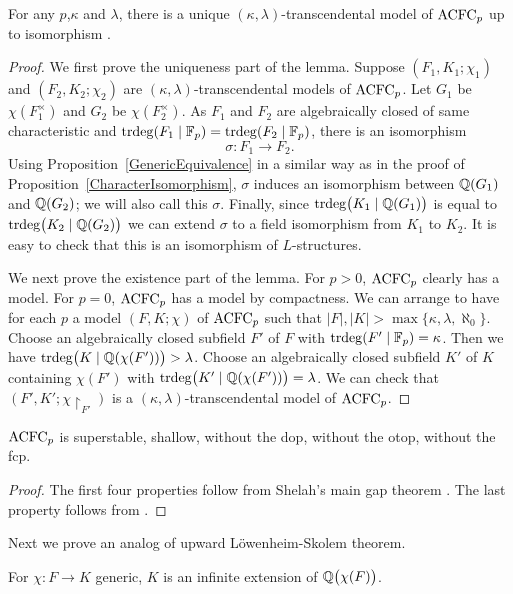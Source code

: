 \begin{thm}\label{ThmIso}

For any $p$,$\kappa$ and $\lambda$, there is a unique $(\kappa,\lambda)$-transcendental model of $\mathrm{ACFC}_p$ up to isomorphism .
\end{thm}


\begin{proof}

We first prove the uniqueness part of the lemma. Suppose $(F_1,K_1;\chi_1)$ and $(F_2,K_2;\chi_2)$ are $(\kappa,\lambda)$-transcendental models of $\mathrm{ACFC}_p$. Let $G_1$ be $\chi (F_1^\times)$ and $G_2$ be $\chi (F_2^\times)$. As $F_1$ and $F_2$ are algebraically closed of same characteristic and  $\mathrm{trdeg}(F_1 \mid\mathbb{F}_p) = \mathrm{trdeg}(F_2 \mid \mathbb{F}_p) $, there is an isomorphism $$\sigma: F_1 \to F_2.$$ Using Proposition~\ref{GenericEquivalence} in a similar way as in the proof of Proposition~\ref{CharacterIsomorphism}, $\sigma$ induces an isomorphism between $ \mathbb{Q}(G_1)$ and $\mathbb{Q}(G_2)$; we will also call this $\sigma$. Finally, since $\mathrm{trdeg}\big(K_1\mid\mathbb{Q}(G_1)\big)$ is equal to $\mathrm{trdeg}\big(K_2\mid \mathbb{Q}(G_2)\big)$ we can extend $\sigma$ to a field isomorphism from $K_1$ to $K_2$. It is easy to check that this is an isomorphism of $L$-structures.

We next prove the existence part of the lemma. For $p>0$, $\mathrm{ACFC}_p$ clearly has a model. For $p=0$, $\mathrm{ACFC}_p$ has a model by compactness. We can arrange to have for each $p$ a model $(F, K; \chi)$ of $\mathrm{ACFC}_p$ such that $|F|, |K| > \max\{\kappa, \lambda, \aleph_0\}$. Choose an algebraically closed subfield $F'$  of $F$ with $\mathrm{trdeg}(F' \mid \mathbb{F}_p) = \kappa$. Then we have $\mathrm{trdeg}\big(K \mid \mathbb{Q}( \chi(F'))\big) > \lambda$. Choose an algebraically closed subfield $K'$ of $K$ containing $\chi(F')$ with $\mathrm{trdeg}\big(K' \mid \mathbb{Q}(\chi(F'))\big) =\lambda$. We can check that $(F', K'; \chi\upharpoonright_{F'})$ is a $(\kappa,\lambda)$-transcendental model of $\mathrm{ACFC}_p$.
\end{proof}

\begin{cor}
$\mathrm{ACFC}_p$ is superstable, shallow, without the dop, without the otop, without the fcp.
\end{cor}

\begin{proof}
The first four properties follow from Shelah's main gap theorem \cite[XII.6.1]{Shelah}. The last property follows from  \cite[VII.3.4]{Shelah}.
\end{proof}

\noindent
Next we prove an analog of upward L\"owenheim-Skolem theorem.
\begin{lem}
For $\chi: F \to K$ generic, $K$ is an infinite extension of $\mathbb{Q}\big(\chi(F)\big)$.
\end{lem}

